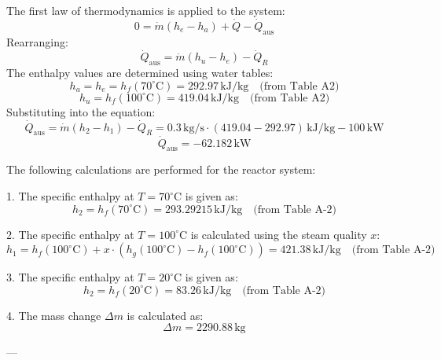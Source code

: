 The first law of thermodynamics is applied to the system:  
\[
0 = \dot{m}(h_e - h_a) + \dot{Q} - \dot{Q}_{\text{aus}}
\]  
Rearranging:  
\[
\dot{Q}_{\text{aus}} = \dot{m}(h_u - h_e) - \dot{Q}_R
\]  
The enthalpy values are determined using water tables:  
\[
h_a = h_e = h_f(70^\circ\text{C}) = 292.97 \, \text{kJ/kg} \quad \text{(from Table A2)}
\]  
\[
h_u = h_f(100^\circ\text{C}) = 419.04 \, \text{kJ/kg} \quad \text{(from Table A2)}
\]  
Substituting into the equation:  
\[
\dot{Q}_{\text{aus}} = \dot{m}(h_2 - h_1) - \dot{Q}_R = 0.3 \, \text{kg/s} \cdot (419.04 - 292.97) \, \text{kJ/kg} - 100 \, \text{kW}
\]  
\[
\dot{Q}_{\text{aus}} = -62.182 \, \text{kW}
\]

The following calculations are performed for the reactor system:

1. The specific enthalpy at \( T = 70^\circ\text{C} \) is given as:  
\[
h_2 = h_f(70^\circ\text{C}) = 293.29215 \, \text{kJ/kg} \quad \text{(from Table A-2)}
\]

2. The specific enthalpy at \( T = 100^\circ\text{C} \) is calculated using the steam quality \( x \):  
\[
h_1 = h_f(100^\circ\text{C}) + x \cdot (h_g(100^\circ\text{C}) - h_f(100^\circ\text{C})) = 421.38 \, \text{kJ/kg} \quad \text{(from Table A-2)}
\]

3. The specific enthalpy at \( T = 20^\circ\text{C} \) is given as:  
\[
h_2 = h_f(20^\circ\text{C}) = 83.26 \, \text{kJ/kg} \quad \text{(from Table A-2)}
\]

4. The mass change \( \Delta m \) is calculated as:  
\[
\Delta m = 2290.88 \, \text{kg}
\]

---
